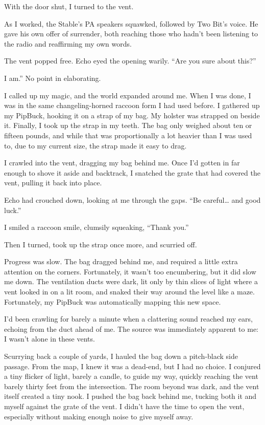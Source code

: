 With the door shut, I turned to the vent.

As I worked, the Stable’s PA speakers squawked, followed by Two Bit’s voice. He gave his own offer of surrender, both reaching those who hadn’t been listening to the radio and reaffirming my own words.

The vent popped free. Echo eyed the opening warily. “Are you sure about this?”

\leavevmode{}I am.” No point in elaborating.

I called up my magic, and the world expanded around me. When I was done, I was in the same changeling-horned raccoon form I had used before. I gathered up my PipBuck, hooking it on a strap of my bag. My holster was strapped on beside it. Finally, I took up the strap in my teeth. The bag only weighed about ten or fifteen pounds, and while that was proportionally a lot heavier than I was used to, due to my current size, the strap made it easy to drag.

I crawled into the vent, dragging my bag behind me. Once I’d gotten in far enough to shove it aside and backtrack, I snatched the grate that had covered the vent, pulling it back into place.

Echo had crouched down, looking at me through the gaps. “Be careful… and good luck.”

I smiled a raccoon smile, clumsily squeaking, “Thank you.”

Then I turned, took up the strap once more, and scurried off.

{\br}%
Progress was slow. The bag dragged behind me, and required a little extra attention on the corners. Fortunately, it wasn’t too encumbering, but it did slow me down. The ventilation ducts were dark, lit only by thin slices of light where a vent looked in on a lit room, and snaked their way around the level like a maze. Fortunately, my PipBuck was automatically mapping this new space.

I’d been crawling for barely a minute when a clattering sound reached my ears, echoing from the duct ahead of me. The source was immediately apparent to me: I wasn’t alone in these vents.

Scurrying back a couple of yards, I hauled the bag down a pitch-black side passage. From the map, I knew it was a dead-end, but I had no choice. I conjured a tiny flicker of light, barely a candle, to guide my way, quickly reaching the vent barely thirty feet from the intersection. The room beyond was dark, and the vent itself created a tiny nook. I pushed the bag back behind me, tucking both it and myself against the grate of the vent. I didn’t have the time to open the vent, especially without making enough noise to give myself away.

